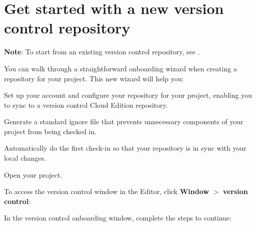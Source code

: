 \chapter{Get started with a new version control repository}
\hypertarget{md__library_2_package_cache_2com_8unity_8collab-proxy_0d2_83_81_2_documentation_0i_2_get_started_new_repository}{}\label{md__library_2_package_cache_2com_8unity_8collab-proxy_0d2_83_81_2_documentation_0i_2_get_started_new_repository}
\label{md__library_2_package_cache_2com_8unity_8collab-proxy_0d2_83_81_2_documentation_0i_2_get_started_new_repository_autotoc_md134}%
%
 {\bfseries{Note}}\+: To start from an existing version control repository, see .

You can walk through a straightforward onboarding wizard when creating a repository for your  project. This new wizard will help you\+:


\begin{DoxyItemize}
\item Set up your account and configure your repository for your  project, enabling you to sync to a version control Cloud Edition repository.
\item Generate a standard ignore file that prevents unnecessary components of your  project from being checked in.
\item Automatically do the first check-\/in so that your repository is in sync with your local changes.
\end{DoxyItemize}
\begin{DoxyEnumerate}
\item Open your  project.
\item To access the version control window in the  Editor, click {\bfseries{Window}} \texorpdfstring{$>$}{>} {\bfseries{version control}}\+: 
\item In the version control onboarding window, complete the steps to continue\+: 
\end{DoxyEnumerate}

